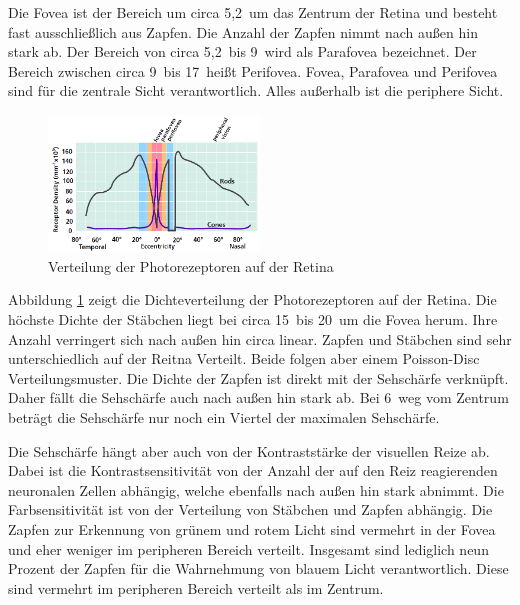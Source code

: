 Die Fovea ist der Bereich um circa 5,2\,\textdegree{} um das Zentrum der Retina und besteht fast ausschließlich aus Zapfen.
Die Anzahl der Zapfen nimmt nach außen hin stark ab.
Der Bereich von circa 5,2\,\textdegree{} bis 9\,\textdegree{} wird als Parafovea bezeichnet.
Der Bereich zwischen circa 9\,\textdegree{} bis 17\,\textdegree{} heißt Perifovea.
Fovea, Parafovea und Perifovea sind für die zentrale Sicht verantwortlich.
Alles außerhalb ist die periphere Sicht.
\begin{figure}
	\centering
	\includegraphics[width=0.5\textwidth]{../../Grafiken/Retinal-photoreceptor-distr_from-star-report.PNG}
	\caption{Verteilung der Photorezeptoren auf der Retina \cite{doi:10.1111/cfg.13150}}
	\label{fig::eye02}
\end{figure}
Abbildung \ref{fig::eye02} zeigt die Dichteverteilung der Photorezeptoren auf der Retina.
Die höchste Dichte der Stäbchen liegt bei circa 15\,\textdegree{} bis 20\,\textdegree{} um die Fovea herum.
Ihre Anzahl verringert sich nach außen hin circa linear.
Zapfen und Stäbchen sind sehr unterschiedlich auf der Reitna Verteilt.
Beide folgen aber einem Poisson-Disc Verteilungsmuster.
Die Dichte der Zapfen ist direkt mit der Sehschärfe verknüpft.
Daher fällt die Sehschärfe auch nach außen hin stark ab.
Bei 6\,\textdegree{} weg vom Zentrum beträgt die Sehschärfe nur noch ein Viertel der maximalen Sehschärfe.

Die Sehschärfe hängt aber auch von der Kontraststärke der visuellen Reize ab.
Dabei ist die Kontrastsensitivität von der Anzahl der auf den Reiz reagierenden neuronalen Zellen abhängig, welche ebenfalls nach außen hin stark abnimmt.
Die Farbsensitivität ist von der Verteilung von Stäbchen und Zapfen abhängig.
Die Zapfen zur Erkennung von grünem und rotem Licht sind vermehrt in der Fovea und eher weniger im peripheren Bereich verteilt.
Insgesamt sind lediglich neun Prozent der Zapfen für die Wahrnehmung von blauem Licht verantwortlich.
Diese sind vermehrt im peripheren Bereich verteilt als im Zentrum.

